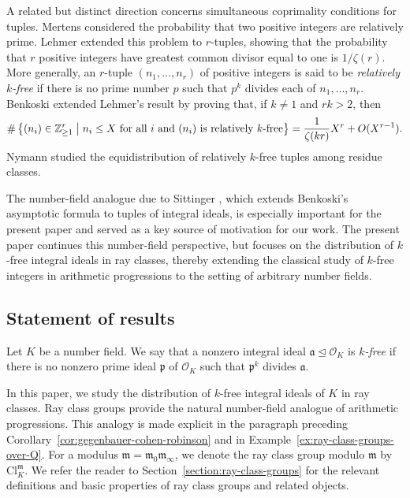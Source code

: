 \documentclass[11pt, reqno]{amsart}
\numberwithin{equation}{section}
\newcommand{\suchthat}{\;\ifnum\currentgrouptype=16 \middle\fi|\;}
\newcommand{\Z}{\mathbb{Z}}
\theoremstyle{definition}
\begin{document}
A related but distinct direction concerns simultaneous coprimality conditions for tuples. Mertens considered the probability that two positive integers are relatively prime. Lehmer \cite{lehmer1900asymptotic} extended this problem to $r$-tuples, showing that the probability that $r$ positive integers have greatest common divisor equal to one is $1/\zeta(r)$. More generally, an $r$-tuple $(n_1,\dots,n_r)$ of positive integers is said to be \emph{relatively $k$-free} if there is no prime number $p$ such that $p^k$ divides each of $n_1,\dots,n_r$. Benkoski \cite{benkoski1976probability} extended Lehmer's result by proving that, if $k \neq 1$ and $rk>2$, then
\begin{align}\label{eqn:benkoski-formula}
\#\left\{
(n_i)\in \Z_{\geq 1}^r
\suchthat
n_i \leq X \text{ for all } i
\text{ and } (n_i) \text{ is relatively $k$-free}
\right\} = 
\frac{1}{\zeta(kr)}X^r + O(X^{r-1}).
\end{align}
Nymann \cite{nymann1992distribution} studied the equidistribution of relatively $k$-free tuples among residue classes. 

The number-field analogue due to Sittinger \cite{Sit10}, which extends Benkoski's asymptotic formula to tuples of integral ideals, is especially important for the present paper and served as a key source of motivation for our work. The present paper continues this number-field perspective, but focuses on the distribution of $k$-free integral ideals in ray classes, thereby extending the classical study of $k$-free integers in arithmetic progressions to the setting of arbitrary number fields.



\subsection{Statement of results}

Let $K$ be a number field. We say that a nonzero integral ideal
$\mathfrak{a}\trianglelefteq\mathcal{O}_K$ is \emph{$k$-free} if
there is no nonzero prime ideal $\mathfrak{p}$ of $\mathcal{O}_K$
such that $\mathfrak{p}^k$ divides $\mathfrak{a}$.

In this paper, we study the distribution of $k$-free integral ideals
of $K$ in ray classes. Ray class groups provide the natural
number-field analogue of arithmetic progressions. This analogy is
made explicit in the paragraph preceding
Corollary~\ref{cor:gegenbauer-cohen-robinson} and in
Example~\ref{ex:ray-class-groups-over-Q}. For a modulus
$\mathfrak{m} = \mathfrak{m}_0 \mathfrak{m}_{\infty}$, we denote the ray class group modulo $\mathfrak{m}$
by $\mathrm{Cl}_K^{\mathfrak{m}}$. We refer the reader to
Section~\ref{section:ray-class-groups} for the relevant definitions
and basic properties of ray class groups and related objects.
\end{document}

